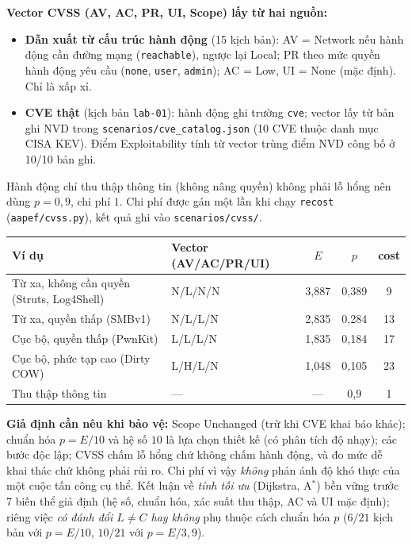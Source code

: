 \documentclass[11pt,a4paper]{article}
\begin{document}
\textbf{Vector CVSS (AV, AC, PR, UI, Scope) lấy từ hai nguồn:}
\begin{itemize}
  \item \textbf{Dẫn xuất từ cấu trúc hành động} (15 kịch bản): AV = Network nếu hành động cần đường mạng (\texttt{reachable}), ngược lại Local; PR theo mức quyền hành động yêu cầu (\texttt{none}, \texttt{user}, \texttt{admin}); AC = Low, UI = None (mặc định). Chỉ là xấp xỉ.
  \item \textbf{CVE thật} (kịch bản \texttt{lab-01}): hành động ghi trường \texttt{cve}; vector lấy từ bản ghi NVD trong \texttt{scenarios/cve\_catalog.json} (10 CVE thuộc danh mục CISA KEV). Điểm Exploitability tính từ vector trùng điểm NVD công bố ở 10/10 bản ghi.
\end{itemize}
Hành động chỉ thu thập thông tin (không nâng quyền) không phải lỗ hổng nên dùng $p=0{,}9$, chi phí $1$. Chi phí được gán một lần khi chạy \texttt{recost} (\texttt{aapef/cvss.py}), kết quả ghi vào \texttt{scenarios/cvss/}.

\begin{center}\small
\begin{tabular}{@{}llccc@{}}
\toprule
Ví dụ & Vector (AV/AC/PR/UI) & $E$ & $p$ & cost \\
\midrule
Từ xa, không cần quyền (Struts, Log4Shell) & N/L/N/N & 3,887 & 0,389 & 9 \\
Từ xa, quyền thấp (SMBv1) & N/L/L/N & 2,835 & 0,284 & 13 \\
Cục bộ, quyền thấp (PwnKit) & L/L/L/N & 1,835 & 0,184 & 17 \\
Cục bộ, phức tạp cao (Dirty COW) & L/H/L/N & 1,048 & 0,105 & 23 \\
Thu thập thông tin & --- & --- & 0,9 & 1 \\
\bottomrule
\end{tabular}
\end{center}

\textbf{Giả định cần nêu khi bảo vệ:} Scope Unchanged (trừ khi CVE khai báo khác); chuẩn hóa $p=E/10$ và hệ số $10$ là lựa chọn thiết kế (có phân tích độ nhạy); các bước độc lập; CVSS chấm lỗ hổng chứ không chấm hành động, và đo mức dễ khai thác chứ không phải rủi ro. Chi phí vì vậy \emph{không} phản ánh độ khó thực của một cuộc tấn công cụ thể. Kết luận về \emph{tính tối ưu} (Dijkstra, A$^{*}$) bền vững trước 7 biến thể giả định (hệ số, chuẩn hóa, xác suất thu thập, AC và UI mặc định); riêng việc \emph{có đánh đổi $L\neq C$ hay không} phụ thuộc cách chuẩn hóa $p$ ($6/21$ kịch bản với $p=E/10$, $10/21$ với $p=E/3{,}9$).
\end{document}
